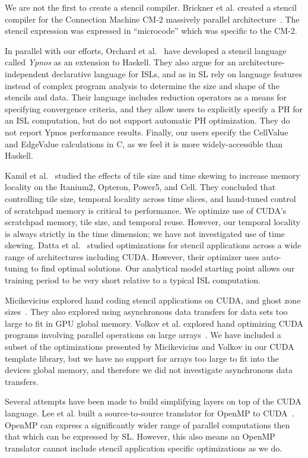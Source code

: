 \documentclass[preprint,nocopyrightspace]{styles/sigplanconf}
\begin{document}
We are not the first to create a stencil compiler.  Brickner et al.
created a stencil compiler for the Connection Machine CM-2 massively
parallel architecture~\cite{cm2}.  The stencil expression was
expressed in ``microcode'' which was specific to
the CM-2.

In parallel with our efforts, Orchard et al.~\cite{ypnos} have developed a
stencil language called {\em Ypnos} as an extension to Haskell.  They also argue for an
architecture-independent declarative language for ISLs, and as in SL rely on language
features instead of complex program analysis to determine the size and shape of
the stencils and data.  Their language includes reduction operators as a means
for specifying convergence criteria, and they allow users to explicitly specify
a PH for an ISL computation, but do not support automatic PH optimization.
They do not report Ypnos performance results.  Finally, our users specify
the CellValue and EdgeValue calculations in C, as we feel it is more
widely-accessible than Haskell. 

Kamil et al.~\cite{kamil} studied the effects of tile size and time skewing to
increase memory locality on the Itanium2, Opteron, Power5, and Cell.  They
concluded that controlling tile size, temporal locality across time slices, and
hand-tuned control of scratchpad memory is critical to performance.  We
optimize use of CUDA's scratchpad memory, tile size, and temporal reuse.
However, our temporal locality is always strictly in the time dimension; we
have not investigated use of time skewing.  Datta et al.~\cite{AutoTuning}
studied optimizations for stencil applications across a wide range of
architectures including CUDA.  However, their optimizer uses auto-tuning to
find optimal solutions.  Our analytical model starting point allows our
training period to be very short relative to a typical ISL computation.

Micikevicius explored hand coding stencil applications on CUDA, and 
ghost zone sizes~\cite{Micikevicius}.  They also
explored using asynchronous data transfers for data sets too large to fit
in GPU global memory.  Volkov et al. explored
hand optimizing CUDA programs involving parallel operations on large
arrays~\cite{volkov}.  We have included a subset of the optimizations presented
by Micikevicius and Volkov in our CUDA template library,  but we have no
support for arrays too large to fit into the devices global memory, and
therefore we did not investigate asynchronous data transfers.

Several attempts have been made to build simplifying layers on top of
the CUDA language.  Lee et al. built a source-to-source
translator for OpenMP to CUDA~\cite{openmp2gpu}.  
OpenMP can express a significantly wider range of parallel computations then that
which can be expressed by SL.  However, this also
means an OpenMP translator cannot include stencil application specific
optimizations as we do.
\end{document}
